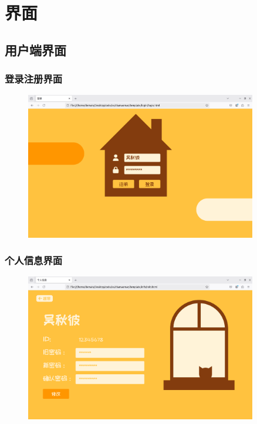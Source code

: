 \documentclass[12pt,a4paper,UTF8]{article}
\begin{document}
\section{界面}

\subsection{用户端界面}

\subsubsection{登录注册界面}

\begin{figure}[H]
  \centering
  \includegraphics[width=0.9\textwidth]{figures/UserLogin.png}
\end{figure}

\subsubsection{个人信息界面}

\begin{figure}[H]
  \centering
  \includegraphics[width=0.9\textwidth]{figures/UserInfo.png}
\end{figure}
\end{document}
